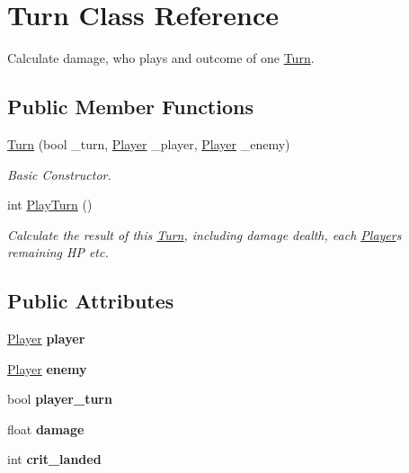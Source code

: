 \hypertarget{class_turn}{}\section{Turn Class Reference}
\label{class_turn}


Calculate damage, who plays and outcome of one \mbox{\hyperlink{class_turn}{Turn}}.  


\subsection*{Public Member Functions}
\begin{DoxyCompactItemize}
\item 
\mbox{\label{class_turn_a573bc57fc636b4699b476aed4c1278ba}} 
\mbox{\hyperlink{class_turn_a573bc57fc636b4699b476aed4c1278ba}{Turn}} (bool \+\_\+turn, \mbox{\hyperlink{class_player}{Player}} \+\_\+player, \mbox{\hyperlink{class_player}{Player}} \+\_\+enemy)
\begin{DoxyCompactList}\small\item\em Basic Constructor. \end{DoxyCompactList}\item 
\mbox{\label{class_turn_abc3ccf0218afc2904a2dbd37561a56b2}} 
int \mbox{\hyperlink{class_turn_abc3ccf0218afc2904a2dbd37561a56b2}{Play\+Turn}} ()
\begin{DoxyCompactList}\small\item\em Calculate the result of this \mbox{\hyperlink{class_turn}{Turn}}, including damage dealth, each \mbox{\hyperlink{class_player}{Player}}\textquotesingle{}s remaining HP etc. \end{DoxyCompactList}\end{DoxyCompactItemize}
\subsection*{Public Attributes}
\begin{DoxyCompactItemize}
\item 
\mbox{\label{class_turn_abcef0253137bf6c75965b66e5f7a4d5e}} 
\mbox{\hyperlink{class_player}{Player}} {\bfseries player}
\item 
\mbox{\label{class_turn_a4ceac3369c1d8eb19b2ad8ac4925b9a7}} 
\mbox{\hyperlink{class_player}{Player}} {\bfseries enemy}
\item 
\mbox{\label{class_turn_ae3877d2983475bd0123819bfb1ad3fa9}} 
bool {\bfseries player\+\_\+turn}
\item 
\mbox{\label{class_turn_a1bd13f96a59a1f958d2e8c98657d860d}} 
float {\bfseries damage}
\item 
\mbox{\label{class_turn_adee435c5c71d7bfe0c701e11dea8c365}} 
int {\bfseries crit\+\_\+landed}
\end{DoxyCompactItemize}
